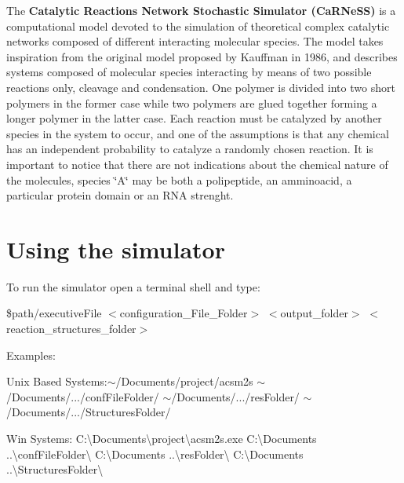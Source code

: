 

 The {\bfseries Catalytic Reactions Network Stochastic Simulator (Ca\-R\-Ne\-S\-S)} is a computational model devoted to the simulation of theoretical complex catalytic networks composed of different interacting molecular species. The model takes inspiration from the original model proposed by Kauffman in 1986, and describes systems composed of molecular species interacting by means of two possible reactions only, cleavage and condensation. One polymer is divided into two short polymers in the former case while two polymers are glued together forming a longer polymer in the latter case. Each reaction must be catalyzed by another species in the system to occur, and one of the assumptions is that any chemical has an independent probability to catalyze a randomly chosen reaction. It is important to notice that there are not indications about the chemical nature of the molecules, species \char`\"{}\-A\char`\"{} may be both a polipeptide, an amminoacid, a particular protein domain or an R\-N\-A strenght.\par
\par
 \hypertarget{intro_secUsage}{}\section{Using the simulator}\label{intro_secUsage}
To run the simulator open a terminal shell and type\-:\par
\par
 {\ttfamily } \$path/executive\-File {\ttfamily } $<$configuration\-\_\-\-File\-\_\-\-Folder$>$ {\ttfamily } $<$output\-\_\-folder$>$ {\ttfamily } $<$reaction\-\_\-structures\-\_\-folder$>$\par
 Examples\-:
\begin{DoxyItemize}
\item Unix Based Systems\-:{\ttfamily $\sim$/\-Documents/project/acsm2s} {\ttfamily $\sim$/\-Documents/}.../conf\-File\-Folder/ {\ttfamily $\sim$/\-Documents/}.../res\-Folder/ {\ttfamily $\sim$/\-Documents/}.../\-Structures\-Folder/
\item Win Systems\-: {\ttfamily C\-:\textbackslash{}Documents\textbackslash{}project\textbackslash{}acsm2s.\-exe} {\ttfamily C\-:\textbackslash{}Documents} ..\textbackslash{}conf\-File\-Folder\textbackslash{} {\ttfamily C\-:\textbackslash{}Documents} ..\textbackslash{}res\-Folder\textbackslash{} {\ttfamily C\-:\textbackslash{}Documents} ..\textbackslash{}Structures\-Folder\textbackslash{}
\end{DoxyItemize}

